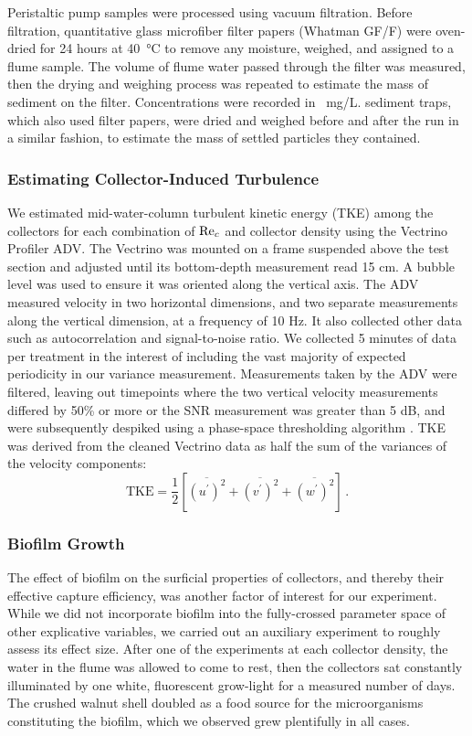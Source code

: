 \documentclass[geosciences,article,submit,moreauthors,pdftex]{Definitions/mdpi}
\begin{document}
Peristaltic pump samples were processed using vacuum filtration. Before filtration, quantitative glass microfiber filter papers (Whatman GF/F) were oven-dried for 24 hours at \SI{40}{\celsius} to remove any moisture, weighed, and assigned to a flume sample. The volume of flume water passed through the filter was measured, then the drying and weighing process was repeated to estimate the mass of sediment on the filter. Concentrations were recorded in \SI{}{\milli\gram/\liter}. sediment traps, which also used filter papers, were dried and weighed before and after the run in a similar fashion, to estimate the mass of settled particles they contained.

\subsubsection{Estimating Collector-Induced Turbulence}

We estimated mid-water-column turbulent kinetic energy (TKE) among the collectors for each combination of $\mathrm{Re}_c$ and collector density using the Vectrino Profiler ADV. The Vectrino was mounted on a frame suspended above the test section and adjusted until its bottom-depth measurement read 15 cm. A bubble level was used to ensure it was oriented along the vertical axis. The ADV measured velocity in two horizontal dimensions, and two separate measurements along the vertical dimension, at a frequency of 10 Hz. It also collected other data such as autocorrelation and signal-to-noise ratio. We collected 5 minutes of data per treatment in the interest of including the vast majority of expected periodicity in our variance measurement. Measurements taken by the ADV were filtered, leaving out timepoints where the two vertical velocity measurements differed by 50\% or more or the SNR measurement was greater than 5 dB, and were subsequently despiked using a phase-space thresholding algorithm \cite{goring_nikora}. TKE was derived from the cleaned Vectrino data as half the sum of the variances of the velocity components:
\begin{equation}
    \text{TKE} = \frac{1}{2}[\overline{(u^\prime)^2} + \overline{(v^\prime)^2} + \overline{(w^\prime)^2}]\,.
    \label{eqn:TKE}
\end{equation}

\subsubsection{Biofilm Growth}

The effect of biofilm on the surficial properties of collectors, and thereby their effective capture efficiency, was another factor of interest for our experiment. While we did not incorporate biofilm into the fully-crossed parameter space of other explicative variables, we carried out an auxiliary experiment to roughly assess its effect size. After one of the experiments at each collector density, the water in the flume was allowed to come to rest, then the collectors sat constantly illuminated by one white, fluorescent grow-light for a measured number of days. The crushed walnut shell doubled as a food source for the microorganisms constituting the biofilm, which we observed grew plentifully in all cases.
\end{document}
